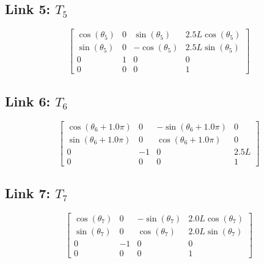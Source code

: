 \subsection*{Link 5: $T_{5}$}
\[ \left[\begin{matrix}\cos{\left(\theta_{5} \right)} & 0 & \sin{\left(\theta_{5} \right)} & 2.5 L \cos{\left(\theta_{5} \right)}\\\sin{\left(\theta_{5} \right)} & 0 & - \cos{\left(\theta_{5} \right)} & 2.5 L \sin{\left(\theta_{5} \right)}\\0 & 1 & 0 & 0\\0 & 0 & 0 & 1\end{matrix}\right] \]
\subsection*{Link 6: $T_{6}$}
\[ \left[\begin{matrix}\cos{\left(\theta_{6} + 1.0 \pi \right)} & 0 & - \sin{\left(\theta_{6} + 1.0 \pi \right)} & 0\\\sin{\left(\theta_{6} + 1.0 \pi \right)} & 0 & \cos{\left(\theta_{6} + 1.0 \pi \right)} & 0\\0 & -1 & 0 & 2.5 L\\0 & 0 & 0 & 1\end{matrix}\right] \]
\subsection*{Link 7: $T_{7}$}
\[ \left[\begin{matrix}\cos{\left(\theta_{7} \right)} & 0 & - \sin{\left(\theta_{7} \right)} & 2.0 L \cos{\left(\theta_{7} \right)}\\\sin{\left(\theta_{7} \right)} & 0 & \cos{\left(\theta_{7} \right)} & 2.0 L \sin{\left(\theta_{7} \right)}\\0 & -1 & 0 & 0\\0 & 0 & 0 & 1\end{matrix}\right] \]
\newpage
